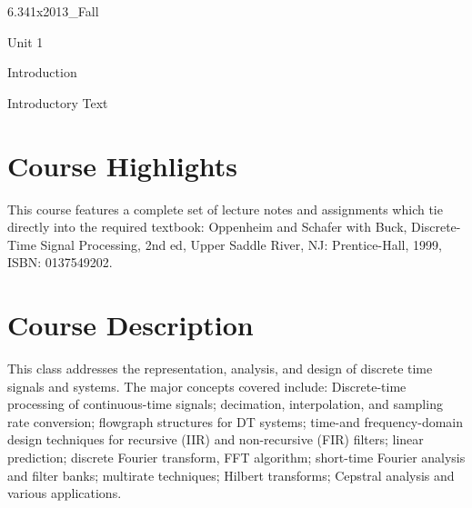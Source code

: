 \documentclass[12pt]{article}
\begin{document}

\begin{edXcourse}{6.341x}{2013_Fall}


\begin{edXchapter}{Unit 1}


\begin{edXsection}{Introduction}


\begin{edXtext}{Introductory Text}

\section{Course Highlights}

This course features a complete set of lecture notes and assignments
which tie directly into the required textbook: Oppenheim and Schafer
with Buck, Discrete-Time Signal Processing, 2nd ed, Upper Saddle
River, NJ: Prentice-Hall, 1999, ISBN: 0137549202.

\section{Course Description}

This class addresses the representation, analysis, and design of
discrete time signals and systems. The major concepts covered include:
Discrete-time processing of continuous-time signals; decimation,
interpolation, and sampling rate conversion; flowgraph structures for
DT systems; time-and frequency-domain design techniques for recursive
(IIR) and non-recursive (FIR) filters; linear prediction; discrete
Fourier transform, FFT algorithm; short-time Fourier analysis and
filter banks; multirate techniques; Hilbert transforms; Cepstral
analysis and various applications.


\end{edXtext}
\end{edXsection}
\end{edXchapter}
\end{edXcourse}
\end{document}
